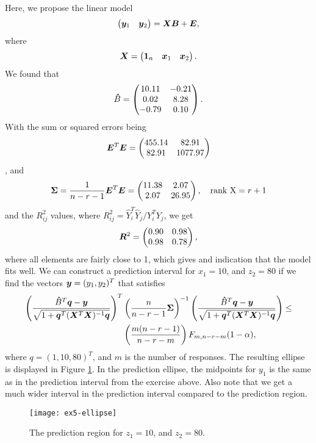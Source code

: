 Here, we propose the linear model
\begin{equation*}
  \begin{pmatrix}
    \bm{y}_1 & \bm{y}_2
  \end{pmatrix} = 
  \bm{X}\bm{B} + \bm{E},
\end{equation*}
where 
\begin{equation*}
 \bm{X} =
  \begin{pmatrix}
    \bm{1}_n & \bm{x}_1 & \bm{x}_2
  \end{pmatrix}.
\end{equation*}
We found that
\begin{equation*}
 \bm{\hat}  B =
  \begin{pmatrix}
    10.11 & -0.21 \\ 
    0.02 & 8.28 \\ 
    -0.79 & 0.10 
  \end{pmatrix}.
\end{equation*}
With the sum or squared errors being
\begin{equation*}
  \bm{E} ^{T} \bm{E} = 
  \begin{pmatrix}
    455.14 &82.91 \\ 
    82.91 &1077.97  
  \end{pmatrix}
\end{equation*}, 
and
\begin{equation*}
  \bm{\Sigma} = \frac{1}{n-r-1} \bm{E} ^{T} \bm{E} = 
  \begin{pmatrix}
    11.38 &2.07 \\ 
    2.07 &26.95  
  \end{pmatrix},\quad \text{rank X} = r+1
\end{equation*}
and the $R^{2}_{ij}$ values, where $R^{2}_{ij} =  \hat Y_{i}^{T} 
\hat Y_{j} /  Y_{i}^{T} Y_{j}$, we get
\begin{equation*}
  \bm{R}^{2} =
  \begin{pmatrix}
    0.90 &0.98 \\ 
    0.98 &0.78
  \end{pmatrix},
\end{equation*}
where all elements are fairly close to 1, which gives and indication
that the model fits well. We can construct a prediction interval for
$x_{1} = 10$, and $z_{2} = 80$ if we find the vectors $\bm{y} =
(y_{1}, y_{2})^{T}$ that
satisfies
\begin{align*}
  \left(
    \frac{\bm{\hat} B^{T} \bm{q} - \bm{y}}{\sqrt{1 + \bm{q}^{T}(\bm{X}^{T} \bm{X})^{-1}\bm{q}}}
  \right)^{T} &
  \left(
    \frac{n}{n-r-1}\bm{\Sigma}
  \right)^{-1}
   \left(
    \frac{\bm{\hat} B^{T} \bm{q} - \bm{y}}{\sqrt{1 + \bm{q}^{T}(\bm{X}^{T} \bm{X})^{-1}\bm{q}}}
  \right)
\leq \\
  &
    \left(
    \frac{m(n-r-1)}{n-r-m}
    \right)
    F_{m,n-r-m}(1-\alpha),
\end{align*}
where $q = (1, 10, 80)^{T}$, and $m$ is the number of responses. The
resulting ellipse is displayed in Figure \ref{fig:ex5-ellipse}. In the
prediction ellipse, the midpoints for $y_{1}$
is the same as in the prediction interval from the exercise above. Also
note that we get a much wider interval in the
prediction interval compared to the prediction region. 

\begin{figure}
  \centering
  \texttt{[image: ex5-ellipse]}
  \caption{The prediction region for $z_1 = 10$, and $z_2 = 80$.}
  \label{fig:ex5-ellipse}
\end{figure}

